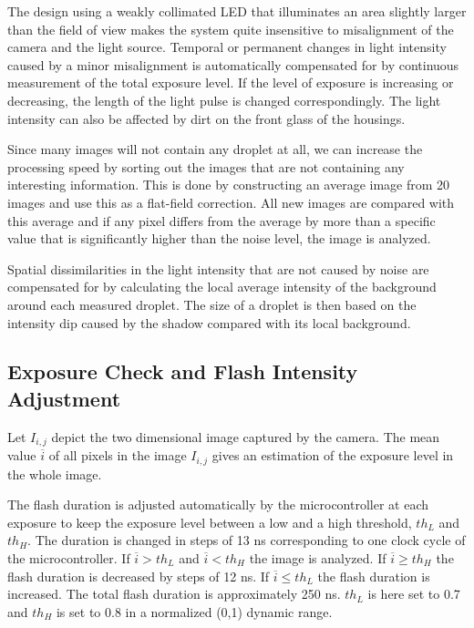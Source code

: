 The design using a weakly collimated LED that illuminates an area slightly larger than the field of view makes the system quite insensitive to misalignment of the camera and the light source. Temporal or permanent changes in light intensity caused by a minor misalignment is automatically compensated for by continuous measurement of the total exposure level. If the level of exposure is increasing or decreasing, the length of the light pulse is changed correspondingly. The light intensity can also be affected by dirt on the front glass of the housings. 

Since many images will not contain any droplet at all, we can increase the processing speed by sorting out the images that are not containing any interesting information. This is done by constructing an average image from 20 images and use this as a flat-field correction. All new images are compared with this average and if any pixel differs from the average by more than a specific value that is significantly higher than the noise level, the image is analyzed.

Spatial dissimilarities in the light intensity that are not caused by noise are compensated for by calculating the local average intensity of the background around each measured droplet. The size of a droplet is then based on the intensity dip caused by the shadow compared with its local background.

\subsection{Exposure Check and Flash Intensity Adjustment}

Let $I_{i,j}$ depict the two dimensional image captured by the camera. The mean value $\overline{i}$ of all pixels in the image $I_{i,j}$ gives an estimation of the exposure level in the whole image. 

The flash duration is adjusted automatically by the microcontroller at each exposure to keep the exposure level between a low and a high threshold, $th_L$ and $th_H$. The duration is changed in steps of 13 ns corresponding to one clock cycle of the microcontroller. If $\overline{i} > th_L$ and $\overline{i} < th_H$ the image is analyzed. If $\overline{i} \geq th_H$ the flash duration is decreased by steps of 12 ns. If $\overline{i} \leq th_L$ the flash duration is increased. The total flash duration is approximately 250 ns. $th_L$ is here set to 0.7 and $th_H$ is set to 0.8 in a normalized (0,1) dynamic range.

